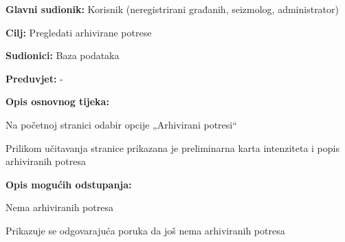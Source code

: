 				\noindent {}
				\begin{packed_item}
					
					\item \textbf{Glavni sudionik:} Korisnik (neregistrirani građanih, seizmolog, administrator)
					\item \textbf{Cilj:} Pregledati arhivirane potrese
					\item \textbf{Sudionici:} Baza podataka
					\item \textbf{Preduvjet:} -
					
					\item \textbf{Opis osnovnog tijeka:}
					
					\item[] \begin{packed_enum}
						\item Na početnoj stranici odabir opcije „Arhivirani potresi“
						\item Prilikom učitavanja stranice prikazana je preliminarna karta intenziteta i popis arhiviranih potresa
					\end{packed_enum}
					
					\item  \textbf{Opis mogućih odstupanja:}
					
					\item[] \begin{packed_item}
						
						\item[2.a] Nema arhiviranih potresa
						\item[] \begin{packed_enum}
							
							\item Prikazuje se odgovarajuća poruka da još nema arhiviranih potresa
							
						\end{packed_enum}
						
					\end{packed_item}
					
				\end{packed_item}

